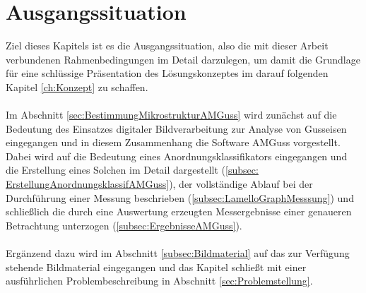 \documentclass[
fontsize=10pt, 
listof = totoc,
parskip = half	
]{report}
\begin{document}
\chapter{Ausgangssituation}
\label{ch:Ausgangssituation}
Ziel dieses Kapitels ist es die Ausgangssituation, also die mit dieser Arbeit verbundenen Rahmenbedingungen im Detail darzulegen, um damit die Grundlage für eine schlüssige Präsentation des Lösungskonzeptes im darauf folgenden Kapitel \ref{ch:Konzept} zu schaffen.
\\\\
Im Abschnitt \ref{sec:BestimmungMikrostrukturAMGuss} wird zunächst auf die Bedeutung des Einsatzes digitaler Bildverarbeitung zur Analyse von Gusseisen eingegangen und in diesem Zusammenhang die Software AMGuss vorgestellt. Dabei wird auf die Bedeutung eines Anordnungsklassifikators eingegangen und die Erstellung eines Solchen im Detail dargestellt (\ref{subsec: ErstellungAnordnungsklassifAMGuss}),  der vollständige Ablauf bei der Durchführung einer Messung beschrieben (\ref{subsec:LamelloGraphMesssung}) und schließlich die durch eine Auswertung erzeugten Messergebnisse einer genaueren Betrachtung unterzogen (\ref{subsec:ErgebnisseAMGuss}).
\\\\
Ergänzend dazu wird im Abschnitt \ref{subsec:Bildmaterial} auf das zur Verfügung stehende Bildmaterial eingegangen und das Kapitel schließt mit einer ausführlichen Problembeschreibung in Abschnitt \ref{sec:Problemstellung}.
\end{document}
